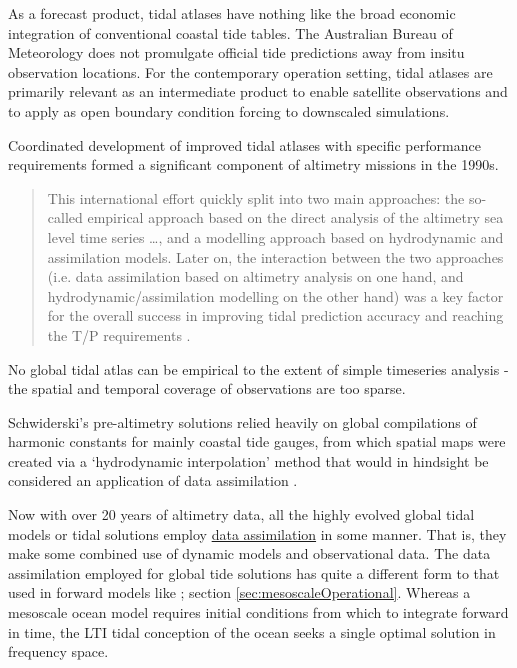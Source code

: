 As a forecast product, tidal atlases have nothing like the broad economic integration of conventional coastal tide tables.  The Australian Bureau of Meteorology does not promulgate official tide predictions away from insitu observation locations. 
For the contemporary operation setting, tidal atlases are primarily relevant as an intermediate product to enable satellite observations and to apply as open boundary condition forcing to downscaled simulations.


Coordinated development of improved tidal atlases with specific performance requirements formed a significant component of altimetry missions in the 1990s.
\begin{quotation}
This international effort quickly split into two main approaches: the so-called empirical approach based on the direct analysis of the altimetry sea level time series \dots{}, and a modelling approach based on hydrodynamic and assimilation models. Later on, the interaction between the two approaches (i.e. data assimilation based on altimetry analysis on one hand, and hydrodynamic/assimilation modelling on the other hand) was a key factor for the overall success in improving tidal prediction accuracy and reaching the T/P requirements \citep[pp394]{Lefevre:2011dg}.
\end{quotation}

No global tidal atlas can be empirical to the extent of simple timeseries analysis - the spatial and temporal coverage of observations are too sparse.

Schwiderski's pre-altimetry solutions relied heavily on global compilations of harmonic constants for mainly coastal tide gauges, from which spatial maps were created via a `hydrodynamic interpolation' method that would in hindsight be considered an application of data assimilation \citep[pp822]{Egbert:1994wz}.

Now with over 20 years of altimetry data, all the highly evolved global tidal models or tidal solutions employ \underline{data assimilation} in some manner.  That is, they make some combined use of dynamic models and observational data.  
The data assimilation employed for global tide solutions has quite a different form to that used in forward models like \BL{}; section \ref{sec:mesoscaleOperational}.  Whereas a mesoscale ocean model requires initial conditions from which to integrate forward in time, the LTI tidal conception of the ocean seeks a single optimal solution in frequency space. 


